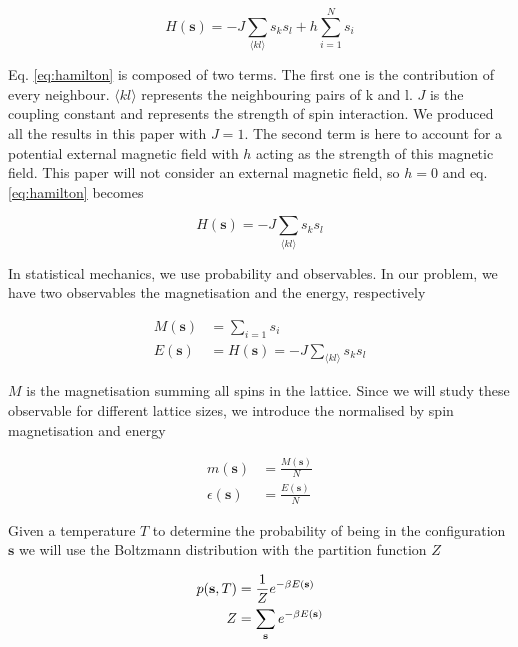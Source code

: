 \documentclass[english,notitlepage,reprint,nofootinbib]{revtex4-2}  %
\begin{document}
	\begin{equation}
		H(\textbf{s}) = -J \sum_{\langle kl \rangle} s_ks_l + h \sum_{i=1}^{N} s_i \label{eq:hamilton}
	\end{equation}

	Eq. \ref{eq:hamilton} is composed of two terms. The first one is the contribution of every
	neighbour. $\langle kl \rangle$ represents the neighbouring pairs of k and l. $J$ is the coupling constant
	and represents the strength of spin interaction. We produced all the results in this paper with $J=1$. The second term is here to account for a potential external magnetic
	field with $h$ acting as the strength of this magnetic field. This paper will not consider an
	external magnetic field, so $h=0$ and eq. \ref{eq:hamilton} becomes

	\begin{equation}
		H(\textbf{s}) = -J \sum_{\langle kl \rangle} s_ks_l \label{eq:Hamiltonian}
	\end{equation}

	In statistical mechanics, we use probability and observables. In our problem, we have two
	observables the magnetisation and the energy, respectively

	\begin{align}
		M(\textbf{s}) &= \sum_{i=1} s_i \label{eq:M}\\
		E(\textbf{s}) &= H(\textbf{s}) = -J \sum_{\langle kl \rangle} s_ks_l \label{eq:E}
	\end{align}

	$M$ is the magnetisation summing all spins in the lattice. Since we will study these
	observable for different lattice sizes, we introduce the normalised by spin magnetisation and
	energy

	\begin{align}
		m(\textbf{s}) &= \frac{M(\textbf{s})}{N} \label{eq:m} \\
		\epsilon(\textbf{s}) &= \frac{E(\textbf{s})}{N}  \label{eq:epsilon}
	\end{align}


	Given a temperature $T$ to determine the probability of being in the configuration
	$\textbf{s}$ we will use the Boltzmann distribution with the partition function $Z$

	\begin{align}
		p(\textbf{s},T) &= \frac{1}{Z} e^{-\beta E(\textbf{s})} \label{eq:B_probability} \\
		Z &= \sum_{\text{\textbf{s}}} e^{-\beta E(\textbf{s})} \label{eq:partition_fun}
	\end{align}
\end{document}
